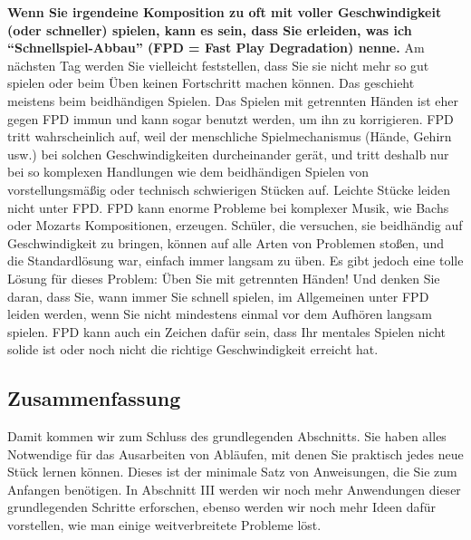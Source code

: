 \label{fpd}

\textbf{Wenn Sie irgendeine Komposition zu oft mit voller Geschwindigkeit (oder schneller) spielen, kann es sein, dass Sie erleiden, was ich \enquote{Schnellspiel-Abbau} (FPD = Fast Play Degradation) nenne.}
Am nächsten Tag werden Sie vielleicht feststellen, dass Sie sie nicht mehr so gut spielen oder beim Üben keinen Fortschritt machen können.
Das geschieht meistens beim beidhändigen Spielen.
Das Spielen mit getrennten Händen ist eher gegen FPD immun und kann sogar benutzt werden, um ihn zu korrigieren.
FPD tritt wahrscheinlich auf, weil der menschliche Spielmechanismus (Hände, Gehirn usw.) bei solchen Geschwindigkeiten durcheinander gerät, und tritt deshalb nur bei so komplexen Handlungen wie dem beidhändigen Spielen von vorstellungsmäßig oder technisch schwierigen Stücken auf.
Leichte Stücke leiden nicht unter FPD.
FPD kann enorme Probleme bei komplexer Musik, wie Bachs oder Mozarts Kompositionen, erzeugen.
Schüler, die versuchen, sie beidhändig auf Geschwindigkeit zu bringen, können auf alle Arten von Problemen stoßen, und die Standardlösung war, einfach immer langsam zu üben.
Es gibt jedoch eine tolle Lösung für dieses Problem: Üben Sie mit getrennten Händen!
Und denken Sie daran, dass Sie, wann immer Sie schnell spielen, im Allgemeinen unter FPD leiden werden, wenn Sie nicht mindestens einmal vor dem Aufhören langsam spielen.
FPD kann auch ein Zeichen dafür sein, dass Ihr mentales Spielen nicht solide ist oder noch nicht die richtige Geschwindigkeit erreicht hat.


\subsection{Zusammenfassung}
\label{c1ii26}

Damit kommen wir zum Schluss des grundlegenden Abschnitts.
Sie haben alles Notwendige für das Ausarbeiten von Abläufen, mit denen Sie praktisch jedes neue Stück lernen können.
Dieses ist der minimale Satz von Anweisungen, die Sie zum Anfangen benötigen.
In Abschnitt III werden wir noch mehr Anwendungen dieser grundlegenden Schritte erforschen, ebenso werden wir noch mehr Ideen dafür vorstellen, wie man einige weitverbreitete Probleme löst.




